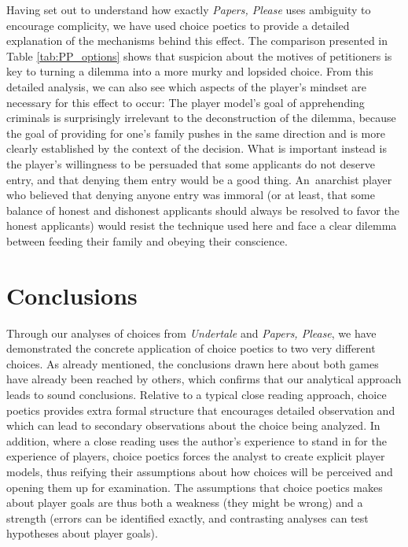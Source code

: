 \documentclass[arts,article,accept,moreauthors,pdftex,10pt,a4paper]{Definitions/mdpi}
\begin{document}
Having set out to understand how exactly \emph{Papers, Please} uses ambiguity to encourage complicity, we have used choice poetics to provide a detailed explanation of the mechanisms behind this effect.
%
The comparison presented in Table \ref{tab:PP_options} shows that suspicion about the motives of petitioners is key to turning a dilemma into a more murky and lopsided choice.
%
From this detailed analysis, we can also see which aspects of the player's mindset are necessary for this effect to occur: The player model's goal of apprehending criminals is surprisingly irrelevant to the deconstruction of the dilemma, because the goal of providing for one's family pushes in the same direction and is more clearly established by the context of the decision.
%
What is important instead is the player's willingness to be persuaded that some applicants do not deserve entry, and that denying them entry would be a good thing.
%
An~anarchist player who believed that denying anyone entry was immoral (or at least, that some balance of honest and dishonest applicants should always be resolved to favor the honest applicants) would resist the technique used here and face a clear dilemma between feeding their family and obeying their conscience.


\section{Conclusions}

Through our analyses of choices from \emph{Undertale} and \emph{Papers, Please}, we have demonstrated the concrete application of choice poetics to two very different choices.
%
As already mentioned, the conclusions drawn here about both games have already been reached by others, which confirms that our analytical approach leads to sound conclusions.
%
Relative to a typical close reading approach, choice poetics provides extra formal structure that encourages detailed observation and which can lead to secondary observations about the choice being analyzed.
%
In addition, where a close reading uses the author's experience to stand in for the experience of players, choice poetics forces the analyst to create explicit player models, thus reifying their assumptions about how choices will be perceived and opening them up for examination.
%
The assumptions that choice poetics makes about player goals are thus both a weakness (they might be wrong) and a strength (errors can be identified exactly, and contrasting analyses can test hypotheses about player goals).
\end{document}
